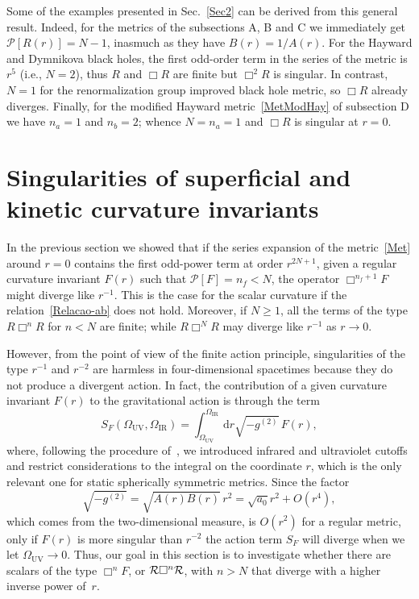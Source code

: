 \documentclass[aps,prd,a4paper,twocolumn,showpacs,showkeys,preprintnumbers,amsmath,amssymb,nofootinbib,usenames,dvipsnames]{revtex4-2}
\def\beq{\begin{equation}}
\def\eeq{\end{equation}}
\newcommand{\rd}{\mathrm{d}}  %
\def\Om{\Omega}
\begin{document}
Some of the examples presented in Sec.~\ref{Sec2} can be derived from this general result. Indeed, for the metrics of the subsections A, B and C we immediately get $\mathcal{P}[R(r)] = N - 1$, inasmuch as they have $B(r)=1/A(r)$. For the Hayward and Dymnikova black holes, the first odd-order term in the series of the metric is $r^5$ ({i.e.}, $N=2$), thus $R$ and $\Box R$ are finite but $\Box^2 R$ is singular. In contrast, $N=1$ for the renormalization group improved black hole metric, so $\Box R$ already diverges. Finally, for the modified Hayward metric~\eqref{MetModHay} of subsection D we have $n_a = 1$ and $n_b=2$; whence $N=n_a=1$ and $\Box R$ is singular at $r=0$.




\section{Singularities of superficial and kinetic curvature invariants}
\label{Sec4}

In the previous section we showed that if the series expansion of the metric~\eqref{Met} around $r=0$ contains the first odd-power term at order $r^{2N+1}$, given a regular curvature invariant $F(r)$ such that $\mathcal{P}[F]=n_f < N$, the operator $\Box^{n_f+1} F$ might diverge like $r^{-1}$. This is the case for the scalar curvature if the relation~\eqref{Relacao-ab} does not hold. Moreover, if $N\geqslant 1$, all the terms of the type $R \Box^n R$ for $n < N$ are finite; while $R \Box^{N} R$ may diverge like $r^{-1} $ as $r \to 0$. 

However, from the point of view of the finite action principle, singularities of the type $r^{-1}$ and $r^{-2}$ are harmless in four-dimensional spacetimes because they do not produce a divergent action. In fact, the contribution of a given curvature invariant $F(r)$ to the gravitational action is through the term
\beq \label{ultimaSQN}
S_F (\Om_{\text{UV}},\Om_{\text{IR}}) = \int_{\Om_{\text{UV}}}^{\Om_{\text{IR}}} \rd r \sqrt{-g^{(2)}}  \,  F(r) ,
\eeq 
where, following the procedure of~\cite{Borissova:2020knn}, we introduced infrared and ultraviolet cutoffs and restrict considerations to the integral on the coordinate $r$, which is the only relevant one for static spherically symmetric metrics. Since the factor
\beq
\sqrt{-g^{(2)}} = \sqrt{A(r)B(r)}  \, r^2 = \sqrt{a_0} r^2 + O(r^4),
\eeq
which comes from the two-dimensional measure, is $O(r^2)$ for a regular metric, only if $F(r)$ is more singular than $r^{-2}$ the action term $S_F$ will diverge when we let $\Om_{\text{UV}}\to 0$.
Thus, our goal in this section is to investigate whether there are scalars of the type $\Box^n F$, or ${\cal R} \Box^n {\cal R}$, with $n>N$ that diverge with a higher inverse power of~$r$.
  
\end{document}
